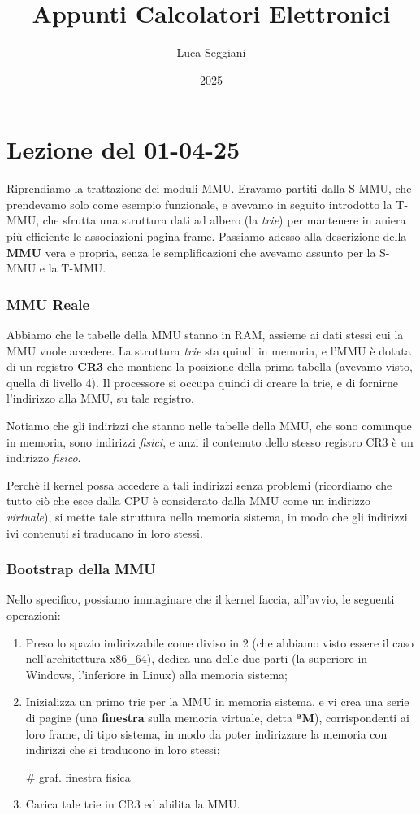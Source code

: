 \documentclass[a4paper,11pt]{article}
\title{Appunti Calcolatori Elettronici}
\author{Luca Seggiani}
\date{2025}
\begin{document}
\section{Lezione del 01-04-25}

\thispagestyle{empty}
\pagestyle{fancy}

Riprendiamo la trattazione dei moduli MMU.
Eravamo partiti dalla S-MMU, che prendevamo solo come esempio funzionale, e avevamo in seguito introdotto la T-MMU, che sfrutta una struttura dati ad albero (la \textit{trie}) per mantenere in aniera più efficiente le associazioni pagina-frame.
Passiamo adesso alla descrizione della \textbf{MMU} vera e propria, senza le semplificazioni che avevamo assunto per la S-MMU e la T-MMU.

\subsubsection{MMU Reale}
Abbiamo che le tabelle della MMU stanno in RAM, assieme ai dati stessi cui la MMU vuole accedere.
La struttura \textit{trie} sta quindi in memoria, e l'MMU è dotata di un registro \textbf{CR3} che mantiene la posizione della prima tabella (avevamo visto, quella di livello 4). 
Il processore si occupa quindi di creare la trie, e di fornirne l'indirizzo alla MMU, su tale registro.

Notiamo che gli indirizzi che stanno nelle tabelle della MMU, che sono comunque in memoria, sono indirizzi \textit{fisici}, e anzi il contenuto dello stesso registro CR3 è un indirizzo \textit{fisico}.

Perchè il kernel possa accedere a tali indirizzi senza problemi (ricordiamo che tutto ciò che esce dalla CPU è considerato dalla MMU come un indirizzo \textit{virtuale}), si mette tale struttura nella memoria sistema, in modo che gli indirizzi ivi contenuti si traducano in loro stessi.

\subsubsection{Bootstrap della MMU}
Nello specifico, possiamo immaginare che il kernel faccia, all'avvio, le seguenti operazioni:
\begin{enumerate}
	\item Preso lo spazio indirizzabile come diviso in 2 (che abbiamo visto essere il caso nell'architettura x86\_64), dedica una delle due parti (la superiore in Windows, l'inferiore in Linux) alla memoria sistema;
	\item Inizializza un primo trie per la MMU in memoria sistema, e vi crea una serie di pagine (una \textbf{finestra} sulla memoria virtuale, detta \textbf{ªM}), corrispondenti ai loro frame, di tipo sistema, in modo da poter indirizzare la memoria con indirizzi che si traducono in loro stessi;

		# graf. finestra fisica 

	\item Carica tale trie in CR3 ed abilita la MMU.
\end{enumerate}
\end{document}
